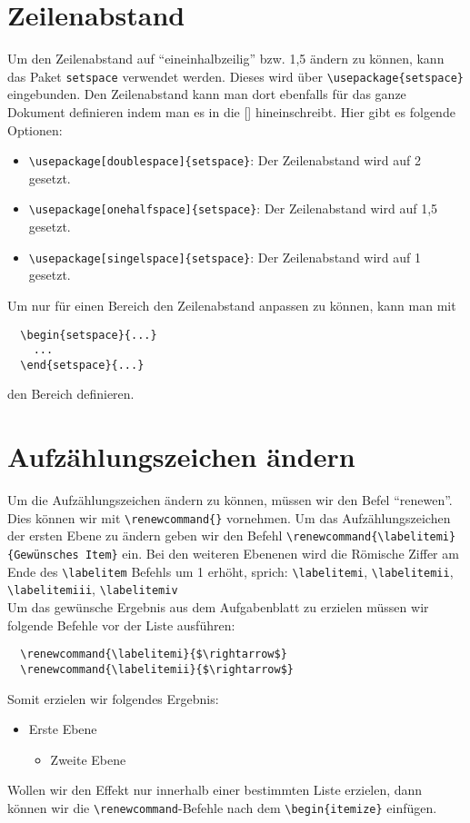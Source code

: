\documentclass[
12pt,
ngerman
]{scrreprt}
\begin{document}
\section{Zeilenabstand}
Um den Zeilenabstand auf "`eineinhalbzeilig"' bzw. 1,5 ändern zu können, kann das Paket \verb!setspace! verwendet werden. Dieses wird über \verb!\usepackage{setspace}! eingebunden. Den Zeilenabstand kann man dort ebenfalls für das ganze Dokument definieren indem man es in die [] hineinschreibt. Hier gibt es folgende Optionen:
\begin{itemize}
  \item \verb!\usepackage[doublespace]{setspace}!: Der Zeilenabstand wird auf 2 gesetzt.
  \item \verb!\usepackage[onehalfspace]{setspace}!: Der Zeilenabstand wird auf 1,5 gesetzt.
  \item \verb!\usepackage[singelspace]{setspace}!: Der Zeilenabstand wird auf 1 gesetzt.
\end{itemize}
Um nur für einen Bereich den Zeilenabstand anpassen zu können, kann man mit
\begin{verbatim}
  \begin{setspace}{...}
    ...
  \end{setspace}{...}
\end{verbatim}
den Bereich definieren.
\section{Aufzählungszeichen ändern}
Um die Aufzählungszeichen ändern zu können, müssen wir den Befel "`renewen"'. Dies können wir mit \verb!\renewcommand{}! vornehmen. Um das Aufzählungszeichen der ersten Ebene zu ändern geben wir den Befehl \verb!\renewcommand{\labelitemi}{Gewünsches Item}! ein. Bei den weiteren Ebenenen wird die Römische Ziffer am Ende des \verb!\labelitem! Befehls um 1 erhöht, sprich: \verb!\labelitemi!, \verb!\labelitemii!, \verb!\labelitemiii!, \verb!\labelitemiv!\\
Um das gewünsche Ergebnis aus dem Aufgabenblatt zu erzielen müssen wir folgende Befehle vor der Liste ausführen:
\begin{verbatim}
  \renewcommand{\labelitemi}{$\rightarrow$}
  \renewcommand{\labelitemii}{$\rightarrow$}
\end{verbatim}
Somit erzielen wir folgendes Ergebnis:
\begin{itemize}
  \renewcommand{\labelitemi}{$\rightarrow$}
  \renewcommand{\labelitemii}{$\rightarrow$}
  \item Erste Ebene
  \begin{itemize}
    \item Zweite Ebene
  \end{itemize}
\end{itemize}
Wollen wir den Effekt nur innerhalb einer bestimmten Liste erzielen, dann können wir die \verb!\renewcommand!-Befehle nach dem \verb!\begin{itemize}! einfügen.
\end{document}
